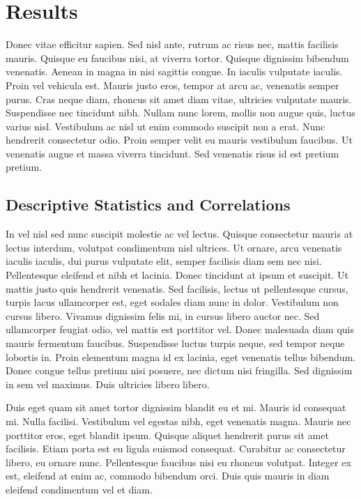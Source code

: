 \section{Results}
\label{sec:4}

Donec vitae efficitur sapien. Sed nisl ante, rutrum ac risus nec, mattis facilisis mauris. Quisque eu faucibus nisi, at viverra tortor. Quisque dignissim bibendum venenatis. Aenean in magna in nisi sagittis congue. In iaculis vulputate iaculis. Proin vel vehicula est. Mauris justo eros, tempor at arcu ac, venenatis semper purus. Cras neque diam, rhoncus sit amet diam vitae, ultricies vulputate mauris. Suspendisse nec tincidunt nibh. Nullam nunc lorem, mollis non augue quis, luctus varius nisl. Vestibulum ac nisl ut enim commodo suscipit non a erat. Nunc hendrerit consectetur odio. Proin semper velit eu mauris vestibulum faucibus. Ut venenatis augue et massa viverra tincidunt. Sed venenatis risus id est pretium pretium.

\subsection{Descriptive Statistics and Correlations}

In vel nisl sed nunc suscipit molestie ac vel lectus. Quisque consectetur mauris at lectus interdum, volutpat condimentum nisl ultrices. Ut ornare, arcu venenatis iaculis iaculis, dui purus vulputate elit, semper facilisis diam sem nec nisi. Pellentesque eleifend et nibh et lacinia. Donec tincidunt at ipsum et suscipit. Ut mattis justo quis hendrerit venenatis. Sed facilisis, lectus ut pellentesque cursus, turpis lacus ullamcorper est, eget sodales diam nunc in dolor. Vestibulum non cursus libero. Vivamus dignissim felis mi, in cursus libero auctor nec. Sed ullamcorper feugiat odio, vel mattis est porttitor vel. Donec malesuada diam quis mauris fermentum faucibus. Suspendisse luctus turpis neque, sed tempor neque lobortis in. Proin elementum magna id ex lacinia, eget venenatis tellus bibendum. Donec congue tellus pretium nisi posuere, nec dictum nisi fringilla. Sed dignissim in sem vel maximus. Duis ultricies libero libero.

Duis eget quam sit amet tortor dignissim blandit eu et mi. Mauris id consequat mi. Nulla facilisi. Vestibulum vel egestas nibh, eget venenatis magna. Mauris nec porttitor eros, eget blandit ipsum. Quisque aliquet hendrerit purus sit amet facilisis. Etiam porta est eu ligula euismod consequat. Curabitur ac consectetur libero, eu ornare nunc. Pellentesque faucibus nisi eu rhoncus volutpat. Integer ex est, eleifend at enim ac, commodo bibendum orci. Duis quis mauris in diam eleifend condimentum vel et diam.

